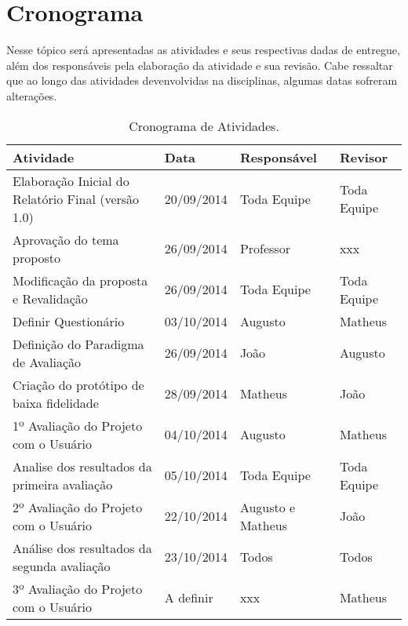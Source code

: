 \chapter[Cronograma]{Cronograma}
\label{chap:cronograma}
	Nesse tópico será apresentadas as atividades e seus respectivas dadas de entregue, além dos responsáveis pela elaboração da atividade e sua revisão. Cabe ressaltar que ao longo das atividades devenvolvidas na disciplinas, algumas datas sofreram alterações.
	
	\label{subsubsec:cronograma_talbe}
		\begin{table}[h]
			\centering
			\begin{tabular}{|p{6.5cm}|p{2.5cm}|p{2.5cm}|p{2.5cm}|}
				\hline
				
				Atividade & Data & Responsável & Revisor \\ \hline
				
				Elaboração Inicial do Relatório Final (versão 1.0) & 20/09/2014 & Toda Equipe & Toda Equipe \\ \hline
				
				Aprovação do tema proposto & 26/09/2014 & Professor & xxx \\ \hline
				
				Modificação da proposta e Revalidação & 26/09/2014 & Toda Equipe & Toda Equipe  \\ \hline

				Definir Questionário & 03/10/2014 & Augusto & Matheus \\ \hline

				Definição do Paradigma de Avaliação & 26/09/2014 & João & Augusto \\ \hline

				Criação do protótipo de baixa fidelidade & 28/09/2014 & Matheus & João \\ \hline

				1º Avaliação do Projeto com o Usuário & 04/10/2014 & Augusto & Matheus \\ \hline

				Analise dos resultados da primeira avaliação & 05/10/2014 & Toda Equipe & Toda Equipe \\ \hline

				2º Avaliação do Projeto com o Usuário & 22/10/2014 & Augusto e Matheus & João \\ \hline

				Análise dos resultados da segunda avaliação & 23/10/2014 & Todos & Todos \\ \hline

				3º Avaliação do Projeto com o Usuário & A definir & xxx & Matheus \\ \hline



			\end{tabular}
			\caption[Cronograma de Atividades]{Cronograma de Atividades.}
			\label{tab:versionamento_tabl}
		\end{table}

